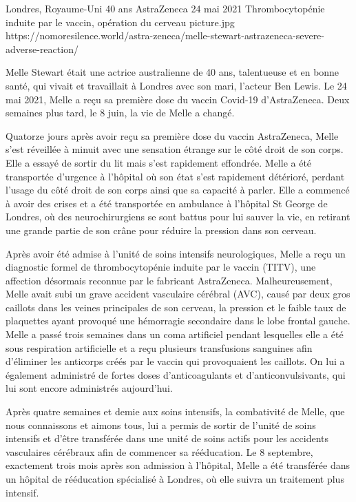 {Londres, Royaume-Uni}
{40 ans}
{AstraZeneca}
{24 mai 2021}
{Thrombocytopénie induite par le vaccin, opération du cerveau}
{picture.jpg}
{https://nomoresilence.world/astra-zeneca/melle-stewart-astrazeneca-severe-adverse-reaction/}
{

Melle Stewart était une actrice australienne de 40 ans, talentueuse et en bonne
santé, qui vivait et travaillait à Londres avec son mari, l'acteur Ben Lewis. Le
24 mai 2021, Melle a reçu sa première dose du vaccin Covid-19
d'AstraZeneca. Deux semaines plus tard, le 8 juin, la vie de Melle a changé.

Quatorze jours après avoir reçu sa première dose du vaccin AstraZeneca, Melle
s'est réveillée à minuit avec une sensation étrange sur le côté droit de son
corps. Elle a essayé de sortir du lit mais s'est rapidement effondrée. Melle a
été transportée d'urgence à l'hôpital où son état s'est rapidement détérioré,
perdant l'usage du côté droit de son corps ainsi que sa capacité à parler. Elle
a commencé à avoir des crises et a été transportée en ambulance à l'hôpital St
George de Londres, où des neurochirurgiens se sont battus pour lui sauver la
vie, en retirant une grande partie de son crâne pour réduire la pression dans
son cerveau.

Après avoir été admise à l'unité de soins intensifs neurologiques, Melle a reçu
un diagnostic formel de thrombocytopénie induite par le vaccin (TITV), une
affection désormais reconnue par le fabricant AstraZeneca. Malheureusement,
Melle avait subi un grave accident vasculaire cérébral (AVC), causé par deux
gros caillots dans les veines principales de son cerveau, la pression et le
faible taux de plaquettes ayant provoqué une hémorragie secondaire dans le lobe
frontal gauche. Melle a passé trois semaines dans un coma artificiel pendant
lesquelles elle a été sous respiration artificielle et a reçu plusieurs
transfusions sanguines afin d'éliminer les anticorps créés par le vaccin qui
provoquaient les caillots. On lui a également administré de fortes doses
d'anticoagulants et d'anticonvulsivants, qui lui sont encore administrés
aujourd'hui.

Après quatre semaines et demie aux soins intensifs, la combativité de Melle, que
nous connaissons et aimons tous, lui a permis de sortir de l'unité de soins
intensifs et d'être transférée dans une unité de soins actifs pour les accidents
vasculaires cérébraux afin de commencer sa rééducation. Le 8 septembre,
exactement trois mois après son admission à l'hôpital, Melle a été transférée
dans un hôpital de rééducation spécialisé à Londres, où elle suivra un
traitement plus intensif.

}
